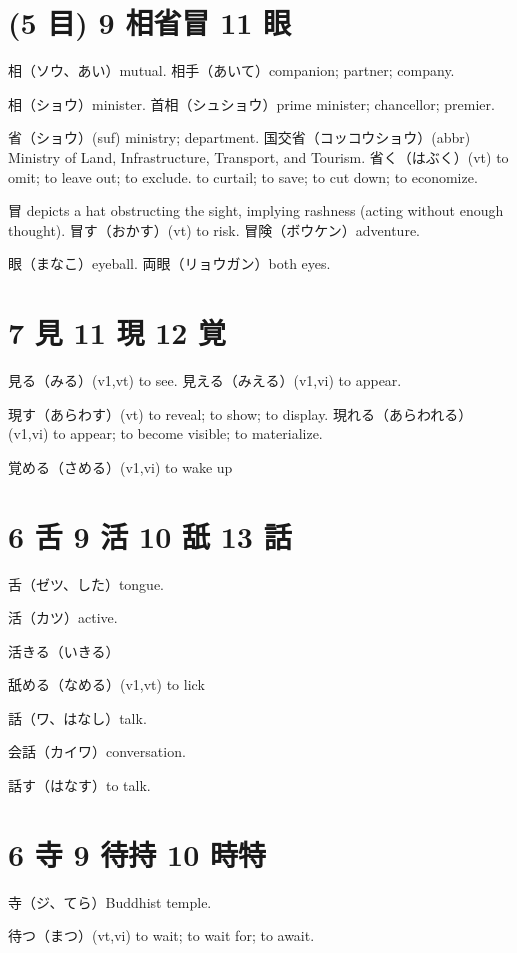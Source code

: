 \section{(5 目) 9 相省冒 11 眼}

相（ソウ、あい）mutual.
相手（あいて）companion; partner; company.

相（ショウ）minister.
首相（シュショウ）prime minister; chancellor; premier.

省（ショウ）(suf) ministry; department.
国交省（コッコウショウ）(abbr)
Ministry of Land, Infrastructure, Transport, and Tourism.
省く（はぶく）(vt)
to omit; to leave out; to exclude.
to curtail; to save; to cut down; to economize.

冒 depicts a hat obstructing the sight, implying rashness
(acting without enough thought).
冒す（おかす）(vt) to risk.
冒険（ボウケン）adventure.

眼（まなこ）eyeball.
両眼（リョウガン）both eyes.

\section{7 見 11 現 12 覚}

見る（みる）(v1,vt) to see.
見える（みえる）(v1,vi) to appear.

現す（あらわす）(vt) to reveal; to show; to display.
現れる（あらわれる）(v1,vi) to appear; to become visible; to materialize.

覚める（さめる）(v1,vi) to wake up

\section{6 舌 9 活 10 舐 13 話}

舌（ゼツ、した）tongue.

活（カツ）active.

活きる（いきる）

舐める（なめる）(v1,vt) to lick

話（ワ、はなし）talk.

会話（カイワ）conversation.

話す（はなす）to talk.

\section{6 寺 9 待持 10 時特}

寺（ジ、てら）Buddhist temple.

待つ（まつ）(vt,vi) to wait; to wait for; to await.

